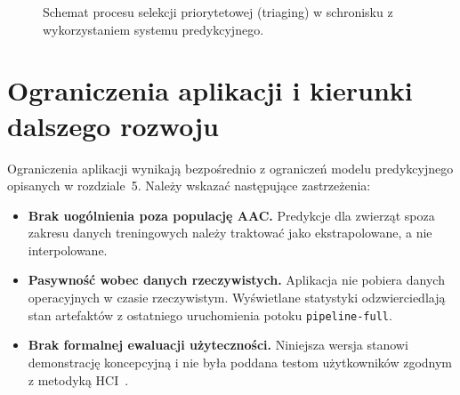 \begin{figure}[htbp]
\centering
{}
\caption{Schemat procesu selekcji priorytetowej (triaging) w schronisku z wykorzystaniem systemu predykcyjnego.}
\label{fig:triaging-workflow}
\end{figure}

\section{Ograniczenia aplikacji i kierunki dalszego rozwoju}
\label{sec:ograniczenia-aplikacji}

Ograniczenia aplikacji wynikają bezpośrednio z ograniczeń modelu predykcyjnego opisanych w rozdziale~5. Należy wskazać następujące zastrzeżenia:

\begin{itemize}
    \item \textbf{Brak uogólnienia poza populację AAC.} Predykcje dla zwierząt spoza zakresu danych treningowych należy traktować jako ekstrapolowane, a nie interpolowane.

    \item \textbf{Pasywność wobec danych rzeczywistych.} Aplikacja nie pobiera danych operacyjnych w czasie rzeczywistym. Wyświetlane statystyki odzwierciedlają stan artefaktów z ostatniego uruchomienia potoku \texttt{pipeline-full}.

    \item \textbf{Brak formalnej ewaluacji użyteczności.} Niniejsza wersja stanowi demonstrację koncepcyjną i nie była poddana testom użytkowników zgodnym z metodyką HCI~\cite{Mosqueira2023}.
\end{itemize}